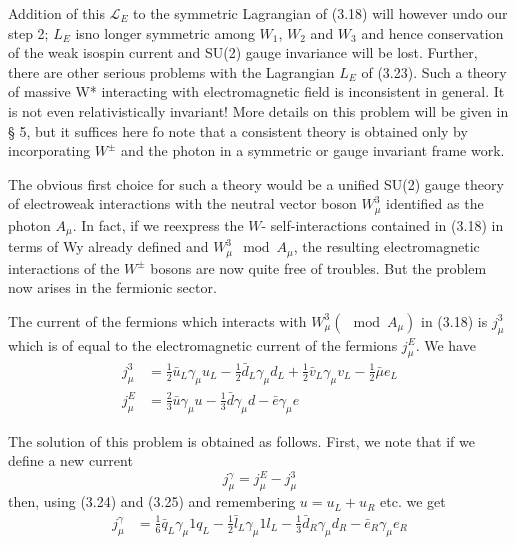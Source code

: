 Addition of this $\mathcal{L}_{E}$ to the symmetric Lagrangian of (3.18) will however undo our step 2; $L_{E}$ isno longer symmetric among $W_{1}$, $W_{2}$ and $W_{3}$ and hence conservation of the weak isospin current 
and SU(2) gauge invariance will be lost. Further, there are other serious problems with the Lagrangian $L_{E}$ of (3.23). Such a theory of massive W* interacting with electromagnetic field is inconsistent in general. It is not even relativistically invariant! More details on this problem will be given in § 5, but it suffices here fo note that a consistent theory is obtained only by incorporating
$W^{\pm}$ and the photon in a symmetric or gauge invariant frame work.

The obvious first choice for such a theory would be a unified SU(2) gauge theory of electroweak
interactions with the neutral vector boson $W^{3}_{\mu}$ identified as the photon $A_{\mu}$. In fact, if we reexpress the $W$- self-interactions contained in (3.18) in terms of Wy already defined and $W^{3}_{\mu}\mod A_{\mu}$, the resulting electromagnetic interactions of the $W^{\pm}$ bosons are now quite free of troubles. But the problem now arises in the fermionic sector.  

The current of the fermions which interacts with $W^{3}_{\mu}(\mod A_{\mu})$ in (3.18) is $j^{3}_{\mu}$ which is of equal to the electromagnetic current of the fermions $j^{E}_{\mu}$. We have
\begin{align*}
j^{3}_{\mu} &= \frac{1}{2} \bar{u}_{L}\gamma_{\mu}u_{L} - \frac{1}{2}\bar{d}_{L}\gamma_{\mu}d_{L} + \frac{1}{2} \bar{v}_{L}\gamma_{\mu}v_{L} - \frac{1}{2}\bar{\mu}e_{L}\tag{3.24}\\
j^{E}_{\mu} & = \frac{2}{3} \bar{u}\gamma_{\mu}u- \frac{1}{3} \bar{d}\gamma_{\mu}d- \bar{e}\gamma_{\mu}e\tag{3.25}
\end{align*}

The solution of this problem is obtained as follows. First, we note that if we define a new current 
\begin{equation*}
j^{\gamma}_{\mu} = j^{E}_{\mu}-j^{3}_{\mu}\tag{3.26}
\end{equation*}
then, using (3.24) and (3.25) and remembering $u=u_{L} + u_{R}$ etc. we get
\begin{align*}
j^{\gamma}_{\mu} &= \frac{1}{6}\bar{q}_{L}\gamma_{\mu}1q_{L} - \frac{1}{2} \bar{l}_{L}\gamma_{\mu}1l_{L}-\frac{1}{3} \bar{d}_{R}\gamma_{\mu}d_{R}- \bar{e}_{R}\gamma_{\mu}e_{R}\tag{3.27}
\end{align*}

